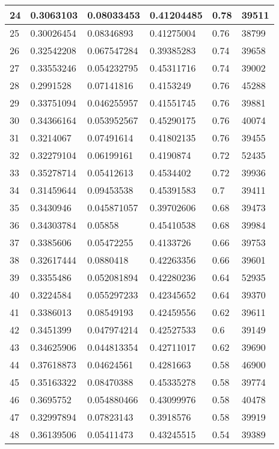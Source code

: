 \begin{longtable}{|l|l|l|l|l|l|}
24 & 0.3063103 & 0.08033453 & 0.41204485 & 0.78 & 39511 \\ \hline 
25 & 0.30026454 & 0.08346893 & 0.41275004 & 0.76 & 38799 \\ \hline 
26 & 0.32542208 & 0.067547284 & 0.39385283 & 0.74 & 39658 \\ \hline 
27 & 0.33553246 & 0.054232795 & 0.45311716 & 0.74 & 39002 \\ \hline 
28 & 0.2991528 & 0.07141816 & 0.4153249 & 0.76 & 45288 \\ \hline 
29 & 0.33751094 & 0.046255957 & 0.41551745 & 0.76 & 39881 \\ \hline 
30 & 0.34366164 & 0.053952567 & 0.45290175 & 0.76 & 40074 \\ \hline 
31 & 0.3214067 & 0.07491614 & 0.41802135 & 0.76 & 39455 \\ \hline 
32 & 0.32279104 & 0.06199161 & 0.4190874 & 0.72 & 52435 \\ \hline 
33 & 0.35278714 & 0.05412613 & 0.4534402 & 0.72 & 39936 \\ \hline 
34 & 0.31459644 & 0.09453538 & 0.45391583 & 0.7 & 39411 \\ \hline 
35 & 0.3430946 & 0.045871057 & 0.39702606 & 0.68 & 39473 \\ \hline 
36 & 0.34303784 & 0.05858 & 0.45410538 & 0.68 & 39984 \\ \hline 
37 & 0.3385606 & 0.05472255 & 0.4133726 & 0.66 & 39753 \\ \hline 
38 & 0.32617444 & 0.0880418 & 0.42263356 & 0.66 & 39601 \\ \hline 
39 & 0.3355486 & 0.052081894 & 0.42280236 & 0.64 & 52935 \\ \hline 
40 & 0.3224584 & 0.055297233 & 0.42345652 & 0.64 & 39370 \\ \hline 
41 & 0.3386013 & 0.08549193 & 0.42459556 & 0.62 & 39611 \\ \hline 
42 & 0.3451399 & 0.047974214 & 0.42527533 & 0.6 & 39149 \\ \hline 
43 & 0.34625906 & 0.044813354 & 0.42711017 & 0.62 & 39690 \\ \hline 
44 & 0.37618873 & 0.04624561 & 0.4281663 & 0.58 & 46900 \\ \hline 
45 & 0.35163322 & 0.08470388 & 0.45335278 & 0.58 & 39774 \\ \hline 
46 & 0.3695752 & 0.054880466 & 0.43099976 & 0.58 & 40478 \\ \hline 
47 & 0.32997894 & 0.07823143 & 0.3918576 & 0.58 & 39919 \\ \hline 
48 & 0.36139506 & 0.05411473 & 0.43245515 & 0.54 & 39389 \\ \hline 

\end{longtable}
